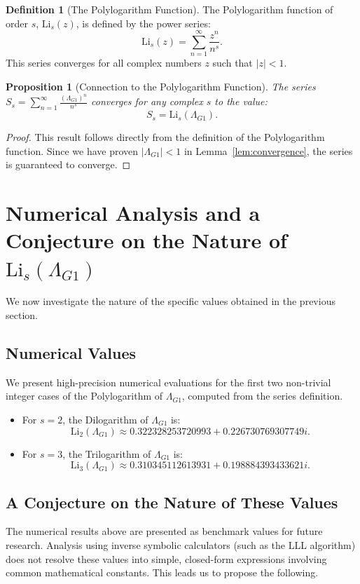 \documentclass{amsart}
\theoremstyle{plain}
\newtheorem{proposition}[proposition]{Proposition}
\theoremstyle{definition}
\newtheorem{definition}[theorem]{Definition}
\theoremstyle{remark}
\newcommand{\LambdaG}{\Lambda_{G1}}
\begin{document}
\begin{definition}[The Polylogarithm Function]
The Polylogarithm function of order $s$, $\mathrm{Li}_s(z)$, is defined by the power series:
$$ \mathrm{Li}_s(z) = \sum_{n=1}^{\infty} \frac{z^n}{n^s}. $$
This series converges for all complex numbers $z$ such that $|z|<1$.
\end{definition}

\begin{proposition}[Connection to the Polylogarithm Function]
The series $S_s = \sum_{n=1}^{\infty} \frac{(\LambdaG)^{n}}{n^s}$ converges for any complex $s$ to the value:
$$S_s = \mathrm{Li}_s(\LambdaG).$$
\end{proposition}
\begin{proof}
This result follows directly from the definition of the Polylogarithm function. Since we have proven $|\LambdaG| < 1$ in Lemma~\ref{lem:convergence}, the series is guaranteed to converge.
\end{proof}

\section{Numerical Analysis and a Conjecture on the Nature of \texorpdfstring{$\mathrm{Li}_s(\LambdaG)$}{Li\_s(Lambda\_G1)}}
We now investigate the nature of the specific values obtained in the previous section.

\subsection{Numerical Values}
We present high-precision numerical evaluations for the first two non-trivial integer cases of the Polylogarithm of $\LambdaG$, computed from the series definition.
\begin{itemize}
    \item For $s=2$, the Dilogarithm of $\LambdaG$ is:
    $$ \mathrm{Li}_2(\LambdaG) \approx 0.322328253720993 + 0.226730769307749i. $$
    \item For $s=3$, the Trilogarithm of $\LambdaG$ is:
    $$ \mathrm{Li}_3(\LambdaG) \approx 0.310345112613931 + 0.198884393433621i. $$
\end{itemize}

\subsection{A Conjecture on the Nature of These Values}
The numerical results above are presented as benchmark values for future research. Analysis using inverse symbolic calculators (such as the LLL algorithm) does not resolve these values into simple, closed-form expressions involving common mathematical constants. This leads us to propose the following.
\end{document}
